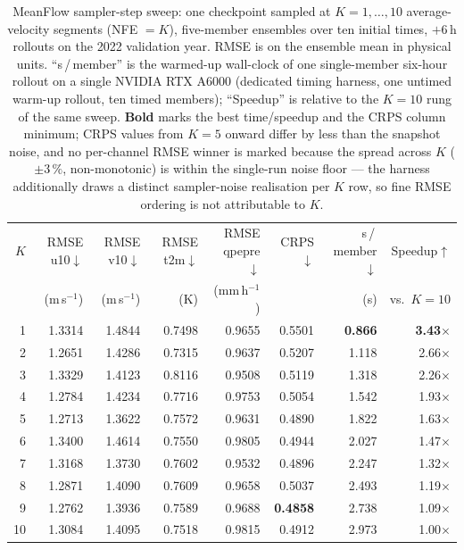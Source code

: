 \begin{table}[htbp]
  \centering
  \caption[MeanFlow sampler-step ($K$) ablation]{MeanFlow sampler-step sweep: one checkpoint sampled at $K = 1, \dots, 10$ average-velocity segments (NFE $= K$), five-member ensembles over ten initial times, $+6$\,h rollouts on the 2022 validation year. RMSE is on the ensemble mean in physical units. ``s\,/\,member'' is the warmed-up wall-clock of one single-member six-hour rollout on a single NVIDIA RTX A6000 (dedicated timing harness, one untimed warm-up rollout, ten timed members); ``Speedup'' is relative to the $K = 10$ rung of the same sweep. \textbf{Bold} marks the best time/speedup and the CRPS column minimum; CRPS values from $K = 5$ onward differ by less than the snapshot noise, and no per-channel RMSE winner is marked because the spread across $K$ ($\pm 3\,\%$, non-monotonic) is within the single-run noise floor --- the harness additionally draws a distinct sampler-noise realisation per $K$ row, so fine RMSE ordering is not attributable to $K$.}
  \label{tab:meanflow-k-sweep}
  \small
  \setlength{\tabcolsep}{5pt}
  \begin{tabular}{rrrrrrrr}
    \toprule
    $K$ & RMSE u10$\downarrow$ & RMSE v10$\downarrow$ & RMSE t2m$\downarrow$ & RMSE qpepre$\downarrow$ & CRPS$\downarrow$ & s\,/\,member$\downarrow$ & Speedup$\uparrow$ \\
     & (m\,s$^{-1}$) & (m\,s$^{-1}$) & (K) & (mm\,h$^{-1}$) & & (s) & vs.\ $K{=}10$ \\
    \midrule
    1  & 1.3314 & 1.4844 & 0.7498 & 0.9655 & 0.5501 & \textbf{0.866} & \textbf{3.43$\times$} \\
    2  & 1.2651 & 1.4286 & 0.7315 & 0.9637 & 0.5207 & 1.118 & 2.66$\times$ \\
    3  & 1.3329 & 1.4123 & 0.8116 & 0.9508 & 0.5119 & 1.318 & 2.26$\times$ \\
    4  & 1.2784 & 1.4234 & 0.7716 & 0.9753 & 0.5054 & 1.542 & 1.93$\times$ \\
    5  & 1.2713 & 1.3622 & 0.7572 & 0.9631 & 0.4890 & 1.822 & 1.63$\times$ \\
    6  & 1.3400 & 1.4614 & 0.7550 & 0.9805 & 0.4944 & 2.027 & 1.47$\times$ \\
    7  & 1.3168 & 1.3730 & 0.7602 & 0.9532 & 0.4896 & 2.247 & 1.32$\times$ \\
    8  & 1.2871 & 1.4090 & 0.7609 & 0.9658 & 0.5037 & 2.493 & 1.19$\times$ \\
    9  & 1.2762 & 1.3936 & 0.7589 & 0.9688 & \textbf{0.4858} & 2.738 & 1.09$\times$ \\
    10 & 1.3084 & 1.4095 & 0.7518 & 0.9815 & 0.4912 & 2.973 & 1.00$\times$ \\
    \bottomrule
  \end{tabular}
\end{table}

